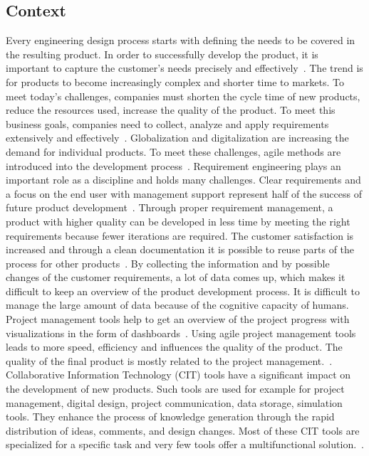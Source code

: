     \subsection*{Context}
    Every engineering design process starts with defining the needs to be covered in the resulting product. In order to successfully develop the product, it is important to capture the customer's needs precisely and effectively~\cite{liu2012scenario}.
    The trend is for products to become increasingly complex and shorter time to markets.
    To meet today's challenges, companies must shorten the cycle time of new products, reduce the resources used, increase the quality of the product. To meet this business goals, companies need to collect, analyze and apply requirements extensively and effectively~\cite{Ahti2005}. Globalization and digitalization are increasing the demand for individual products. To meet these challenges, agile methods are introduced into the development process~\cite{HEIMICKE2021786}. Requirement engineering plays an important role as a discipline and holds many challenges. Clear requirements and a focus on the end user with management support represent half of the success of future product development~\cite{6226784}.
    Through proper requirement management, a product with higher quality can be developed in less time by meeting the right requirements because fewer iterations are required. The customer satisfaction is increased and through a clean documentation it is possible to reuse parts of the process for other products~\cite{BAXTER2008585}.
    By collecting the information and by possible changes of the customer requirements, a lot of data comes up, which makes it difficult to keep an overview of the product development process. It is difficult to manage the large amount of data because of the cognitive capacity of humans. Project management tools help to get an overview of the project progress with visualizations in the form of dashboards~\cite{RICHTER2020271}.
    Using agile project management tools leads to more speed, efficiency and influences the quality of the product. The quality of the final product is mostly related to the project management.~\cite{ozkan2019agile}. 
    Collaborative Information Technology (CIT) tools have a significant impact on the development of new products. Such tools are used for example for project management, digital design, project communication, data storage, simulation tools. They enhance the process of knowledge generation through the rapid distribution of ideas, comments, and design changes. Most of these CIT tools are specialized for a specific task and very few tools offer a multifunctional solution.~\cite{MarionTucker}.
    
